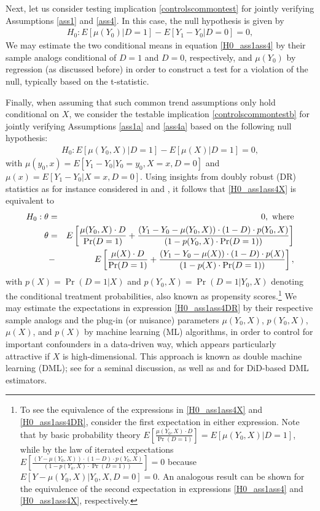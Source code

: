 {	Next, let us consider testing implication \eqref{controlscommontest} for jointly verifying Assumptions \ref{ass1} and \ref{ass4}. In this case, the null hypothesis is given by
	\begin{eqnarray} \label{H0_ass1ass4}
		H_0: E[\mu(Y_0)|D=1]-E[Y_1-Y_0|D=0]=0,
	\end{eqnarray}
	We may estimate the two conditional means in equation \eqref{H0_ass1ass4} by their sample analogs conditional of $D=1$ and $D=0$, respectively, and $\mu(Y_0)$ by regression (as discussed before)  in order to construct a test for a violation of the null, typically based on the t-statistic. 
	
	Finally, when assuming that such common trend assumptions only hold conditional on $X$, we consider the testable implication \eqref{controlscommontestb} for jointly verifying  Assumptions \ref{ass1a} and \ref{ass4a} based on the following null hypothesis:
	\begin{eqnarray} \label{H0_ass1ass4X}
		H_0: E[\mu(Y_0,X) |D=1]-E[\mu(X)|D=1]=0,
	\end{eqnarray}
	with $\mu(y_0, x)=E[Y_1-Y_0|Y_0=y_0, X=x,D=0]$ and $\mu(x)=E[Y_1-Y_0|X=x,D=0]$. Using insights from doubly robust (DR) statistics as for instance considered in \citet{Robins+94} and \citet{RoRo95}, it follows that \eqref{H0_ass1ass4X} is equivalent to
	\begin{eqnarray} \label{H0_ass1ass4DR}
		H_0: \theta&=&0,\textrm{ where}\notag\\		
		\theta&=&E\left[\frac{\mu(Y_0,X)\cdot D}{\Pr(D=1)}+\frac{(Y_1-Y_0-\mu(Y_0,X))\cdot (1-D)\cdot p(Y_0,X)}{(1-p(Y_0,X)\cdot \Pr(D=1))} \right]\notag\\
		&-&E\left[ \frac{\mu(X)\cdot D}{\Pr(D=1)}+\frac{(Y_1-Y_0-\mu(X))\cdot (1-D)\cdot p(X)}{(1-p(X)\cdot \Pr(D=1))}\right],
	\end{eqnarray}
	with $p(X)=\Pr(D=1|X)$ and $p(Y_0,X)=\Pr(D=1|Y_0,X)$ denoting the conditional treatment probabilities, also known as propensity scores.\footnote{To see the equivalence of the expressions in \eqref{H0_ass1ass4X} and \eqref{H0_ass1ass4DR}, consider the first expectation in either expression. Note that by basic probability theory $E\left[\frac{\mu(Y_0,X)\cdot D}{\Pr(D=1)}\right]=E[\mu(Y_0,X) |D=1]$, while by the law of iterated expectations $E\left[ \frac{(Y-\mu(Y_0,X))\cdot (1-D)\cdot p(Y_0,X)}{(1-p(Y_0,X)\cdot \Pr(D=1))} \right]=0$ because $E[Y-\mu(Y_0,X)|Y_0,X,D=0]=0$. An analogous result can be shown for the equivalence of the second expectation in expressions \eqref{H0_ass1ass4} and \eqref{H0_ass1ass4X}, respectively.}
	We may estimate the expectations in expression \eqref{H0_ass1ass4DR} by their respective sample analogs and the plug-in (or nuisance) parameters $\mu(Y_0,X)$, $p(Y_0,X)$, $\mu(X)$, and $p(X)$ by machine learning (ML) algorithms, in order to control for important confounders in a data-driven way,  	which appears particularly attractive if $X$ is high-dimensional. This approach is known as double machine learning (DML); see \citet{Chetal2018} for a seminal discussion, as well as \citet{Chang2020} and \cite{Zimmert2018} for DiD-based DML estimators.
	
}
